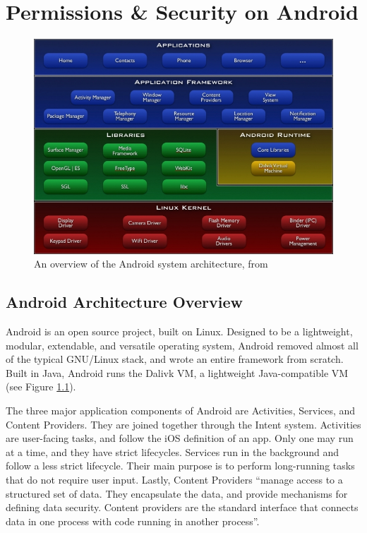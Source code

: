 \chapter{Permissions \& Security on Android}
\label{sec:permissions}

\begin{figure}[t]
\begin{center}
\includegraphics[width=0.7\columnwidth]{figs/system-architecture}
\caption{An overview of the Android system architecture, from \citep{androidarchitectureoverview}}
\label{fig:androidoverview}
\end{center}
\end{figure}


\section{Android Architecture Overview}
Android is an open source project, built on Linux. Designed to be a lightweight, modular, extendable, and versatile operating system, Android removed almost all of the typical GNU/Linux stack, and wrote an entire framework from scratch. Built in Java, Android runs the Dalivk VM, a lightweight Java-compatible VM (see Figure \ref{fig:androidoverview}). 

The three major application components of Android are Activities, Services, and Content Providers. They are joined together through the Intent system. Activities are user-facing tasks, and follow the iOS definition of an app. Only one may run at a time, and they have strict lifecycles. Services run in the background and follow a less strict lifecycle. Their main purpose is to perform long-running tasks that do not require user input. Lastly, Content Providers ``manage access to a structured set of data. They encapsulate the data, and provide mechanisms for defining data security. Content providers are the standard interface that connects data in one process with code running in another process''\citep{androidcontentproviders}.

